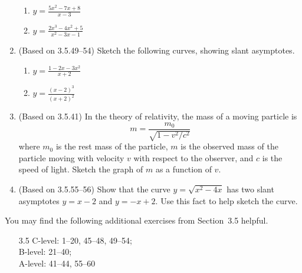 \documentclass{article}
\newcommand{\ds}{\displaystyle}
\begin{document}
\begin{enumerate}
\begin{multicols}{2}
    \begin{enumerate}
    \item $\ds y = \frac{5x^2-7x+8}{x-3}$
    \item $\ds y = \frac{2x^3-4x^2+5}{x^2-3x-1}$
    \end{enumerate}
  \end{multicols}
\item (Based on 3.5.49--54) %
  Sketch the following curves, showing slant asymptotes.
  \begin{multicols}{2}
    \begin{enumerate}
    \item $\ds y = \frac{1-2x-3x^2}{x+2}$
    \item $\ds y = \frac{(x-2)^3}{(x+2)^2}$
    \end{enumerate}
  \end{multicols}
\item (Based on 3.5.41) %
  In the theory of relativity, the mass of a moving particle is
  \begin{displaymath}
    m = \frac{m_0}{\sqrt{1-v^2/c^2}}
  \end{displaymath}
  where $m_0$ is the rest mass of the particle, $m$ is the observed
  mass of the particle moving with velocity $v$ with respect to the
  observer, and $c$ is the speed of light.  Sketch the graph of $m$ as
  a function of $v$.
\item (Based on 3.5.55--56) %
  Show that the curve $y=\sqrt{x^2-4x}$ has two slant asymptotes
  $y=x-2$ and $y=-x+2$.  Use this fact to help sketch the curve.
\end{enumerate}

\noindent
You may find the following additional exercises from Section~3.5
helpful.
\begin{itemize}
\item[3.5]
  C-level: 1--20, 45--48, 49--54; \\
  B-level: 21--40; \\
  A-level: 41--44, 55--60
\end{itemize}
\end{document}
